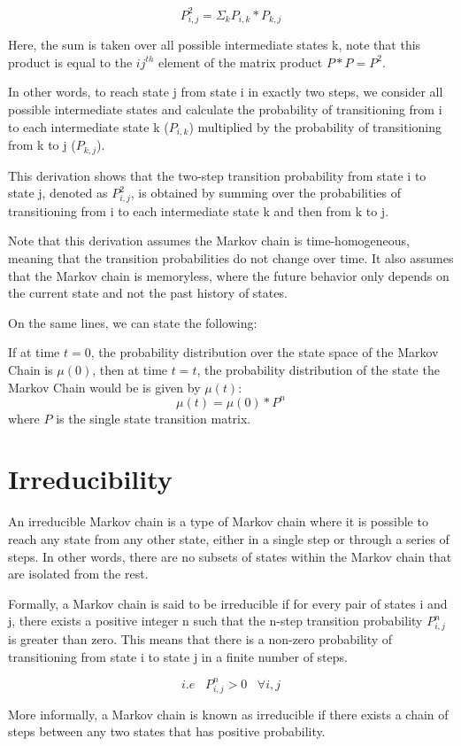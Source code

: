 \documentclass[a4paper,11pt]{scrarticle}
\begin{document}
\[P^2_{i,j} = \Sigma_k P_{i,k} * P_{k,j}\]

Here, the sum is taken over all possible intermediate states k, note that this product is equal to the $ij^{th}$ element of the matrix product $P*P = P^2$.

In other words, to reach state j from state i in exactly two steps, we consider all possible intermediate states and calculate the probability of transitioning from i to each intermediate state k ($P_{i,k}$) multiplied by the probability of transitioning from k to j ($P_{k,j}$).

This derivation shows that the two-step transition probability from state i to state j, denoted as $P^2_{i,j}$, is obtained by summing over the probabilities of transitioning from i to each intermediate state k and then from k to j.

Note that this derivation assumes the Markov chain is time-homogeneous, meaning that the transition probabilities do not change over time. It also assumes that the Markov chain is memoryless, where the future behavior only depends on the current state and not the past history of states.

On the same lines, we can state the following:

\begin{theorem}
If at time $t=0$, the probability distribution over the state space of the Markov Chain is $\mu(0)$, then at time $t=t$, the probability distribution of the state the Markov Chain would be is given by $\mu(t)$:
\[\mu(t) = \mu(0) * P^n\] where $P$ is the single state transition matrix.

\end{theorem}

\section{Irreducibility}
An irreducible Markov chain is a type of Markov chain where it is possible to reach any state from any other state, either in a single step or through a series of steps. In other words, there are no subsets of states within the Markov chain that are isolated from the rest.

Formally, a Markov chain is said to be irreducible if for every pair of states i and j, there exists a positive integer n such that the n-step transition probability $P^n_{i,j}$ is greater than zero. This means that there is a non-zero probability of transitioning from state i to state j in a finite number of steps.

\[i.e \; \; \; P^n_{i,j} > 0 \;\;\; \forall i,j \]

More informally, a Markov chain is known as irreducible if there exists a chain of steps between any two states that has positive probability.
\end{document}

